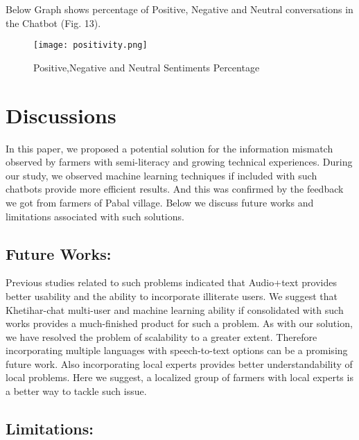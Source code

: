 \documentclass[10pt,conference]{IEEEtran}
\begin{document}
{\raggedright
Below Graph shows percentage of Positive, Negative and Neutral conversations in the Chatbot (Fig. 13).
}
\begin{figure}[h]
 \centering
   \texttt{[image: positivity.png]}
  \caption{Positive,Negative and Neutral Sentiments Percentage}
\end{figure}




	\section{Discussions}

{\raggedright
In this paper, we proposed a potential solution for the information mismatch observed by farmers with semi-literacy and growing technical experiences. During our study, we observed machine learning techniques if included with such chatbots provide more efficient results. And this was confirmed by the feedback we got from farmers of Pabal village. Below we discuss future works and limitations associated with such solutions.
}


\subsection{Future Works:}


{\raggedright
Previous studies related to such problems indicated that Audio+text provides better usability and the ability to incorporate illiterate users. We suggest that Khetihar-chat multi-user and machine learning ability if consolidated with such works provides a much-finished product for such a problem. As with our solution, we have resolved the problem of scalability to a greater extent. Therefore incorporating multiple languages with speech-to-text options can be a  promising future work. Also incorporating local experts provides better understandability of local problems. Here we suggest, a localized group of farmers with local experts is a better way to tackle such issue.
}



\subsection{Limitations:}
\end{document}
